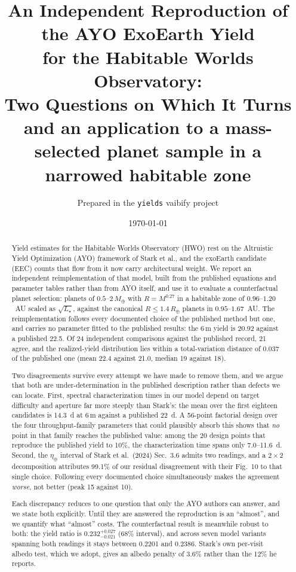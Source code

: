 \documentclass[11pt,a4paper]{article}
\title{\bfseries An Independent Reproduction of the AYO ExoEarth Yield\\
for the Habitable Worlds Observatory:\\
Two Questions on Which It Turns\\[0.4em]
\large and an application to a mass-selected planet sample in a narrowed habitable zone}
\author{Prepared in the \texttt{yields} vaibify project}
\date{\today}
\begin{document}
\maketitle

\begin{abstract}
\noindent
Yield estimates for the Habitable Worlds Observatory (HWO) rest on the Altruistic Yield
Optimization (AYO) framework of Stark et al., and the exoEarth candidate (EEC) counts that flow
from it now carry architectural weight. We report an independent reimplementation of that model,
built from the published equations and parameter tables rather than from AYO itself, and use it
to evaluate a counterfactual planet selection: planets of $0.5$--$2\,M_\oplus$ with
$R = M^{0.27}$ in a habitable zone of $0.96$--$1.20$~AU scaled as $\sqrt{L_\star}$, against the
canonical $R \le 1.4\,R_\oplus$ planets in $0.95$--$1.67$~AU. The reimplementation follows
every documented choice of the published method but one, and carries no parameter fitted to the
published results: the $6\,$m yield is 20.92 against a published 22.5. Of 24
independent comparisons against the published record, 21 agree, and the realized-yield
distribution lies within a total-variation distance of 0.037 of the published one (mean
22.4 against 21.0, median 19 against 18).

Two disagreements survive every attempt we have made to remove them, and we argue that both are
under-determination in the published description rather than defects we can locate. First,
spectral characterization times in our model depend on target difficulty and aperture far more
steeply than Stark's: the mean over the first eighteen candidates is 14.3~d at $6\,$m
against a published 22~d. A 56-point factorial design over the four throughput-family
parameters that could plausibly absorb this shows that \emph{no} point in that family reaches the
published value: among the 20 design points that reproduce the published yield to
10\%, the characterization time spans only 7.0--11.6~d. Second, the
$\eta_\oplus$ interval of Stark et al.\ (2024) Sec.~3.6 admits two readings, and a $2\times2$
decomposition attributes 99.1\% of our residual disagreement with their Fig.~10 to
that single choice. Following every documented choice simultaneously makes the agreement
\emph{worse}, not better (peak 15 against 10).

Each discrepancy reduces to one question that only the AYO authors can answer, and we state both
explicitly. Until they are answered the reproduction is an ``almost'', and we quantify what
``almost'' costs. The counterfactual result is meanwhile robust to both: the yield ratio is
$0.232^{+0.027}_{-0.021}$ (68\% interval), and across seven model variants
spanning both readings it stays between 0.2201 and 0.2386. Stark's own
per-visit albedo test, which we adopt, gives an albedo penalty of 3.6\% rather than the
12\% he reports.
\end{abstract}
\end{document}
